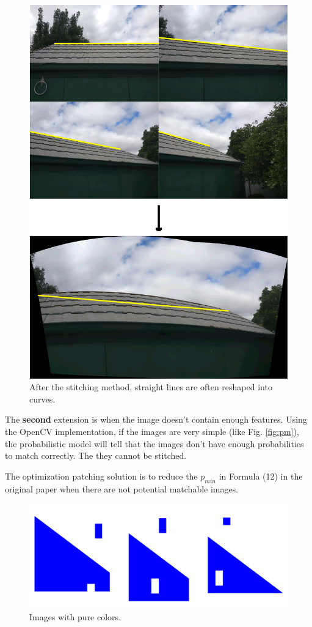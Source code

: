 \documentclass[10pt,twocolumn,letterpaper]{article}
\begin{document}
\begin{figure}[t]
    \begin{center}
        \includegraphics[width=0.9\linewidth]{line_combine}
    \end{center}
    \caption{After the stitching method, straight lines are often reshaped into curves.}
    \label{fig:cml}
\end{figure}

The \textbf{second} extension is when the image doesn't contain enough features.
Using the OpenCV implementation, if the images are very simple (like Fig. \ref{fig:pm}),
the probabilistic model will tell that the images don't have enough probabilities to match correctly.
The they cannot be stitched.

The optimization patching solution is to reduce the $p_{min}$ in Formula (12) in the original paper when there are not potential matchable images.

\begin{figure}[t]
    \begin{center}
        \includegraphics[width=0.9\linewidth]{pure_color}
    \end{center}
    \caption{Images with pure colors.}
    \label{fig:pc}
\end{figure}
\end{document}
